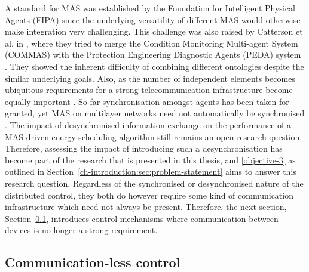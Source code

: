 A standard for MAS was established by the Foundation for Intelligent Physical Agents (FIPA) since the underlying versatility of different MAS would otherwise make integration very challenging.
This challenge was also raised by Catterson et al. in \cite{Catterson2005}, where they tried to merge the Condition Monitoring Multi-agent System (COMMAS) \cite{McArthur2004a} with the Protection Engineering Diagnostic Agents (PEDA) system \cite{Hossack2003a}.
They showed the inherent difficulty of combining different ontologies despite the similar underlying goals.
Also, as the number of independent elements becomes ubiquitous requirements for a strong telecommunication infrastructure become equally important \cite{Hatziargyriou2015}.
So far synchronisation amongst agents has been taken for granted, yet MAS on multilayer networks need not automatically be synchronised \cite{He2017}.
The impact of desynchronised information exchange on the performance of a MAS driven energy scheduling algorithm still remains an open research question.
Therefore, assessing the impact of introducing such a desynchronisation has become part of the research that is presented in this thesis, and \ref{objective-3} as outlined in Section~\ref{ch-introduction:sec:problem-statement} aims to answer this research question.
Regardless of the synchronised or desynchronised nature of the distributed control, they both do however require some kind of communication infrastructure which need not always be present.
Therefore, the next section, Section~\ref{ch-literature:subsec:communication-less-control}, introduces control mechanisms where communication between devices is no longer a strong requirement.

\subsection{Communication-less control}
\label{ch-literature:subsec:communication-less-control}

